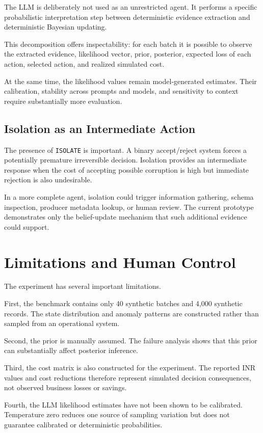 \documentclass{article}
\begin{document}
The LLM is deliberately not used as an unrestricted agent. It performs a specific probabilistic interpretation step between deterministic evidence extraction and deterministic Bayesian updating.

This decomposition offers inspectability: for each batch it is possible to observe the extracted evidence, likelihood vector, prior, posterior, expected loss of each action, selected action, and realized simulated cost.

At the same time, the likelihood values remain model-generated estimates. Their calibration, stability across prompts and models, and sensitivity to context require substantially more evaluation.


\subsection{Isolation as an Intermediate Action}

The presence of \texttt{ISOLATE} is important. A binary accept/reject system forces a potentially premature irreversible decision. Isolation provides an intermediate response when the cost of accepting possible corruption is high but immediate rejection is also undesirable.

In a more complete agent, isolation could trigger information gathering, schema inspection, producer metadata lookup, or human review. The current prototype demonstrates only the belief-update mechanism that such additional evidence could support.


\section{Limitations and Human Control}

The experiment has several important limitations.

First, the benchmark contains only 40 synthetic batches and 4,000 synthetic records. The state distribution and anomaly patterns are constructed rather than sampled from an operational system.

Second, the prior is manually assumed. The failure analysis shows that this prior can substantially affect posterior inference.

Third, the cost matrix is also constructed for the experiment. The reported INR values and cost reductions therefore represent simulated decision consequences, not observed business losses or savings.

Fourth, the LLM likelihood estimates have not been shown to be calibrated. Temperature zero reduces one source of sampling variation but does not guarantee calibrated or deterministic probabilities.
\end{document}
